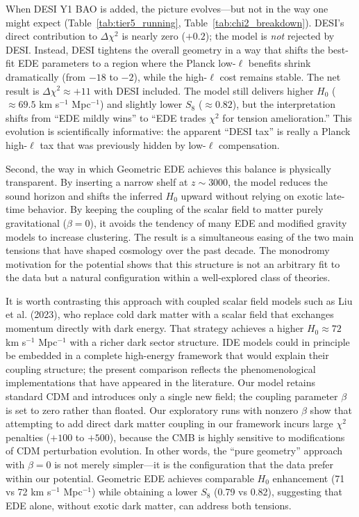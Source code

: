 \documentclass[a4paper,11pt]{article}
\begin{document}
When DESI Y1 BAO is added, the picture evolves---but not in the way one might expect (Table~\ref{tab:tier5_running}, Table~\ref{tab:chi2_breakdown}). DESI's direct contribution to $\Delta\chi^2$ is nearly zero ($+0.2$); the model is \emph{not} rejected by DESI. Instead, DESI tightens the overall geometry in a way that shifts the best-fit EDE parameters to a region where the Planck low-$\ell$ benefits shrink dramatically (from $-18$ to $-2$), while the high-$\ell$ cost remains stable. The net result is $\Delta\chi^2 \approx +11$ with DESI included. The model still delivers higher $H_0$ ($\approx 69.5$ km s$^{-1}$ Mpc$^{-1}$) and slightly lower $S_8$ ($\approx 0.82$), but the interpretation shifts from ``EDE mildly wins'' to ``EDE trades $\chi^2$ for tension amelioration.'' This evolution is scientifically informative: the apparent ``DESI tax'' is really a Planck high-$\ell$ tax that was previously hidden by low-$\ell$ compensation.

Second, the way in which Geometric EDE achieves this balance is physically transparent. By inserting a narrow shelf at $z \sim 3000$, the model reduces the sound horizon and shifts the inferred $H_0$ upward without relying on exotic late-time behavior. By keeping the coupling of the scalar field to matter purely gravitational ($\beta = 0$), it avoids the tendency of many EDE and modified gravity models to increase clustering. The result is a simultaneous easing of the two main tensions that have shaped cosmology over the past decade. The monodromy motivation for the potential shows that this structure is not an arbitrary fit to the data but a natural configuration within a well-explored class of theories.

It is worth contrasting this approach with coupled scalar field models such as Liu et al. (2023), who replace cold dark matter with a scalar field that exchanges momentum directly with dark energy. That strategy achieves a higher $H_0 \approx 72$ km s$^{-1}$ Mpc$^{-1}$ with a richer dark sector structure. IDE models could in principle be embedded in a complete high-energy framework that would explain their coupling structure; the present comparison reflects the phenomenological implementations that have appeared in the literature. Our model retains standard CDM and introduces only a single new field; the coupling parameter $\beta$ is set to zero rather than floated. Our exploratory runs with nonzero $\beta$ show that attempting to add direct dark matter coupling in our framework incurs large $\chi^2$ penalties ($+100$ to $+500$), because the CMB is highly sensitive to modifications of CDM perturbation evolution. In other words, the ``pure geometry'' approach with $\beta = 0$ is not merely simpler---it is the configuration that the data prefer within our potential. Geometric EDE achieves comparable $H_0$ enhancement (71 vs 72 km s$^{-1}$ Mpc$^{-1}$) while obtaining a lower $S_8$ (0.79 vs 0.82), suggesting that EDE alone, without exotic dark matter, can address both tensions.
\end{document}
